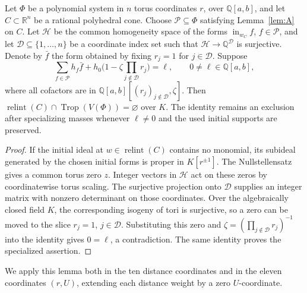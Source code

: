 \documentclass[11pt]{amsart}
\theoremstyle{definition}\newtheorem{definition}[theorem]{Definition}\theoremstyle{remark}\newtheorem{remark}[theorem]{Remark}
\newcommand{\Trop}{\operatorname{Trop}}\newcommand{\inn}{\operatorname{in}}\newcommand{\Q}{\mathbb{Q}}
\begin{document}
\begin{lemma}\label{lem:B}
Let $\Phi$ be a polynomial system in $n$ torus coordinates $r$, over $\Q[a,b]$, and let $C\subset\mathbb R^n$ be a rational polyhedral cone. Choose $\mathcal P\subseteq\Phi$ satisfying Lemma~\ref{lem:A} on $C$. Let $\mathcal H$ be the common homogeneity space of the forms $\inn_{w_C}f$, $f\in\mathcal P$, and let $\mathcal D\subseteq\{1,\ldots,n\}$ be a coordinate index set such that $\mathcal H\to\Q^{\mathcal D}$ is surjective. Denote by $\bar f$ the form obtained by fixing $r_j=1$ for $j\in\mathcal D$. Suppose
\[
 \sum_{f\in\mathcal P}h_f\bar f+
 h_0\bigl(1-\zeta\prod_{j\notin\mathcal D}r_j\bigr)=\ell,
 \qquad 0\ne\ell\in\Q[a,b],
\]
where all cofactors are in $\Q[a,b][(r_j)_{j\notin\mathcal D},\zeta]$. Then $\operatorname{relint}(C)\cap\Trop(V(\Phi))=\varnothing$ over $K$. The identity remains an exclusion after specializing masses whenever $\ell\ne0$ and the used initial supports are preserved.
\end{lemma}
\begin{proof}
If the initial ideal at $w\in\operatorname{relint}(C)$ contains no monomial, its subideal generated by the chosen initial forms is proper in $K[r^{\pm1}]$. The Nullstellensatz gives a common torus zero $z$. Integer vectors in $\mathcal H$ act on these zeros by coordinatewise torus scaling. The surjective projection onto $\mathcal D$ supplies an integer matrix with nonzero determinant on those coordinates. Over the algebraically closed field $K$, the corresponding isogeny of tori is surjective, so a zero can be moved to the slice $r_j=1$, $j\in\mathcal D$. Substituting this zero and $\zeta=(\prod_{j\notin\mathcal D}r_j)^{-1}$ into the identity gives $0=\ell$, a contradiction. The same identity proves the specialized assertion.
\end{proof}
We apply this lemma both in the ten distance coordinates and in the eleven coordinates $(r,U)$, extending each distance weight by a zero $U$-coordinate.
\end{document}
